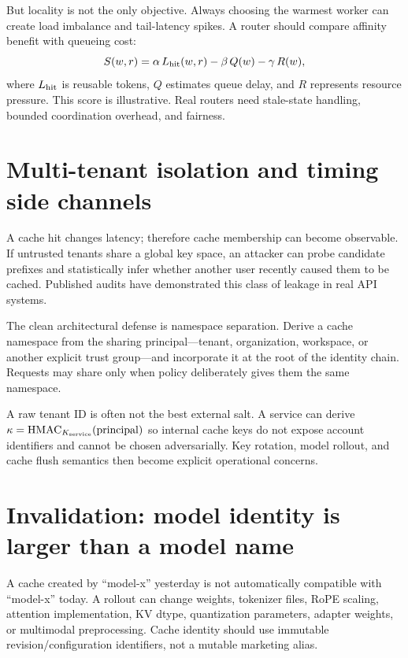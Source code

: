 But locality is not the only objective. Always choosing the warmest worker can create
load imbalance and tail-latency spikes. A router should compare affinity benefit with
queueing cost:
\[
S(w,r)=\alpha\,L_{\rm hit}(w,r)-\beta\,Q(w)-\gamma\,R(w),
\]
where $L_{\rm hit}$ is reusable tokens, $Q$ estimates queue delay, and $R$ represents
resource pressure. This score is illustrative. Real routers need stale-state handling,
bounded coordination overhead, and fairness.

\section{Multi-tenant isolation and timing side channels}

A cache hit changes latency; therefore cache membership can become observable. If
untrusted tenants share a global key space, an attacker can probe candidate prefixes
and statistically infer whether another user recently caused them to be cached.
Published audits have demonstrated this class of leakage in real API systems.

The clean architectural defense is namespace separation. Derive a cache namespace
from the sharing principal---tenant, organization, workspace, or another explicit
trust group---and incorporate it at the root of the identity chain. Requests may
share only when policy deliberately gives them the same namespace.

A raw tenant ID is often not the best external salt. A service can derive
$\kappa=\mathrm{HMAC}_{K_{\rm service}}(\mathrm{principal})$ so internal cache keys
do not expose account identifiers and cannot be chosen adversarially. Key rotation,
model rollout, and cache flush semantics then become explicit operational concerns.


\section{Invalidation: model identity is larger than a model name}

A cache created by ``model-x'' yesterday is not automatically compatible with
``model-x'' today. A rollout can change weights, tokenizer files, RoPE scaling,
attention implementation, KV dtype, quantization parameters, adapter weights, or
multimodal preprocessing. Cache identity should use immutable revision/configuration
identifiers, not a mutable marketing alias.

